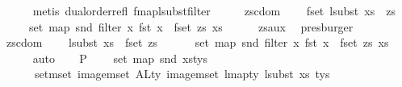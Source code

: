 \begin{isabellebody}
\ \ \ \ \isamarkupfalse%
\ {\isacharparenleft}{\kern0pt}metis\ dual{\isacharunderscore}{\kern0pt}order{\isachardot}{\kern0pt}refl\ fmap{\isacharunderscore}{\kern0pt}lsubst{\isacharunderscore}{\kern0pt}filter{\isacharparenright}{\kern0pt}\isanewline
\ \ \isamarkupfalse%
\ \isamarkupfalse%
\ zs{\isacharunderscore}{\kern0pt}cdom{\isacharcolon}{\kern0pt}\isanewline
\ \ \ \ {\isachardoublequoteopen}fset\ {\isacharparenleft}{\kern0pt}{\isacharparenleft}{\kern0pt}lsubst\ xs{\isacharparenright}{\kern0pt}\ {\isacharbar}{\kern0pt}{\isacharbackquote}{\kern0pt}{\isacharbar}{\kern0pt}\ zs{\isacharparenright}{\kern0pt}\ {\isacharequal}{\kern0pt}\isanewline
\ \ \ \ \ set\ {\isacharparenleft}{\kern0pt}map\ snd\ {\isacharparenleft}{\kern0pt}filter\ {\isacharparenleft}{\kern0pt}{\isasymlambda}x{\isachardot}{\kern0pt}\ fst\ x\ {\isasymin}\ fset\ zs{\isacharparenright}{\kern0pt}\ xs{\isacharparenright}{\kern0pt}{\isacharparenright}{\kern0pt}{\isachardoublequoteclose}\isanewline
\ \ \ \ \isamarkupfalse%
\ zs{\isacharunderscore}{\kern0pt}aux{}\ \isamarkupfalse%
\ presburger\isanewline
\ \ \isamarkupfalse%
\ \isamarkupfalse%
\ zs{\isacharunderscore}{\kern0pt}cdom{}{\isacharcolon}{\kern0pt}\isanewline
\ \ \ \ {\isachardoublequoteopen}{\isacharparenleft}{\kern0pt}lsubst\ xs{\isacharparenright}{\kern0pt}\ {\isacharbackquote}{\kern0pt}\ fset\ zs\ {\isacharequal}{\kern0pt}\isanewline
\ \ \ \ \ set\ {\isacharparenleft}{\kern0pt}map\ snd\ {\isacharparenleft}{\kern0pt}filter\ {\isacharparenleft}{\kern0pt}{\isasymlambda}x{\isachardot}{\kern0pt}\ fst\ x\ {\isasymin}\ fset\ zs{\isacharparenright}{\kern0pt}\ xs{\isacharparenright}{\kern0pt}{\isacharparenright}{\kern0pt}{\isachardoublequoteclose}\isanewline
\ \ \ \ \isamarkupfalse%
\ auto\isanewline
\isanewline
\ \ \isamarkupfalse%
\ P{}{}{\isacharcolon}{\kern0pt}\isanewline
\ \ \ \ {\isachardoublequoteopen}set\ {\isacharparenleft}{\kern0pt}map\ snd\ xs{\isacharunderscore}{\kern0pt}tys{\isacharparenright}{\kern0pt}\ {\isacharequal}{\kern0pt}\isanewline
\ \ \ \ \ {\isacharparenleft}{\kern0pt}{\isasymUnion}\ {\isacharparenleft}{\kern0pt}set{\isacharunderscore}{\kern0pt}mset\ {\isacharparenleft}{\kern0pt}image{\isacharunderscore}{\kern0pt}mset\ ALty\ {\isacharparenleft}{\kern0pt}image{\isacharunderscore}{\kern0pt}mset\ {\isacharparenleft}{\kern0pt}lmap{\isacharunderscore}{\kern0pt}ty\ {\isacharparenleft}{\kern0pt}lsubst\ xs{\isacharparenright}{\kern0pt}{\isacharparenright}{\kern0pt}\ tys{\isacharparenright}{\kern0pt}{\isacharparenright}{\kern0pt}{\isacharparenright}{\kern0pt}{\isacharparenright}{\kern0pt}{\isachardoublequoteclose}\isanewline

\end{isabellebody}
